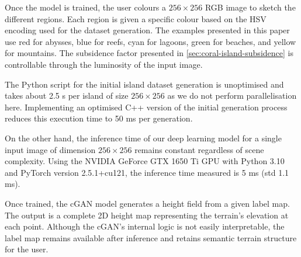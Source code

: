 Once the model is trained, the user colours a $256\times256$ RGB image to sketch the different regions. Each region is given a specific colour based on the HSV encoding used for the dataset generation. The examples presented in this paper use red for abysses, blue for reefs, cyan for lagoons, green for beaches, and yellow for mountains. The subsidence factor presented in \cref{sec:coral-island-subsidence} is controllable through the luminosity of the input image.

The Python script for the initial island dataset generation is unoptimised and takes about 2.5 s per island of size $256 \times 256$ as we do not perform parallelisation here. Implementing an optimised C++ version of the initial generation process reduces this execution time to 50 ms per generation.

On the other hand, the inference time of our deep learning model for a single input image of dimension $256 \times 256$ remains constant regardless of scene complexity. Using the NVIDIA GeForce GTX 1650 Ti GPU with Python 3.10 and PyTorch version 2.5.1+cu121, the inference time measured is 5 ms (std 1.1 ms).


Once trained, the cGAN model generates a height field from a given label map. The output is a complete 2D height map representing the terrain's elevation at each point. Although the cGAN's internal logic is not easily interpretable, the label map remains available after inference and retains semantic terrain structure for the user.



